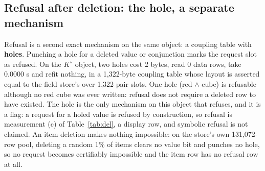 \documentclass{article} %
\newcommand{\Kstar}{\ensuremath{K^{\star}}}
\begin{document}
\subsection{Refusal after deletion: the hole, a separate mechanism}
\label{sec:hole}

Refusal is a second exact mechanism on the same object: a coupling table with \textbf{holes}.
Punching a hole for a deleted value or conjunction marks the request slot as refused. On the
$\Kstar$ object, two holes cost 2 bytes, read 0 data rows, take 0.0000 s and refit nothing, in
a 1,322-byte coupling table whose layout is asserted equal to the field store's over 1,322 pair
slots. %
One hole (red $\wedge$ cube) is refusable although no red cube was ever written: refusal does
not require a deleted row to have existed. %
The hole is the only mechanism on this object that refuses, and it is a flag: a request for a
holed value is refused by construction, so refusal is measurement (c) of Table~\ref{tab:del}, a
display row, and symbolic refusal is not claimed. An item deletion makes nothing impossible: on the store's own 131,072-row pool, deleting a random
1\% of items clears no value bit and punches no hole, so no request becomes certifiably impossible
and the item row has no refusal row at all. %
\end{document}
